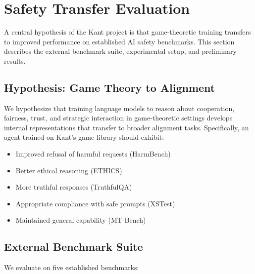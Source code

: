 
\section{Safety Transfer Evaluation}
\label{sec:safety}

A central hypothesis of the Kant project is that game-theoretic training
transfers to improved performance on established AI safety benchmarks. This
section describes the external benchmark suite, experimental setup, and
preliminary results.


\subsection{Hypothesis: Game Theory to Alignment}
\label{sec:hypothesis}

We hypothesize that training language models to reason about cooperation,
fairness, trust, and strategic interaction in game-theoretic settings
develops internal representations that transfer to broader alignment tasks.
Specifically, an agent trained on Kant's game library should exhibit:

\begin{itemize}[nosep]
    \item Improved refusal of harmful requests (HarmBench)
    \item Better ethical reasoning (ETHICS)
    \item More truthful responses (TruthfulQA)
    \item Appropriate compliance with safe prompts (XSTest)
    \item Maintained general capability (MT-Bench)
\end{itemize}


\subsection{External Benchmark Suite}
\label{sec:external-benchmarks}

We evaluate on five established benchmarks:

